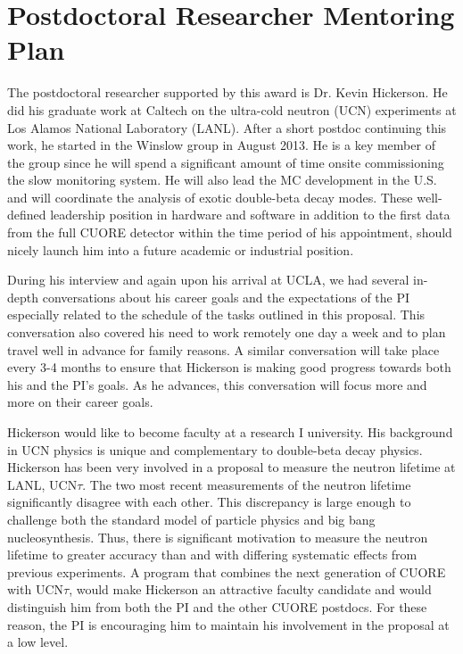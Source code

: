 \section{Postdoctoral Researcher Mentoring Plan}
The postdoctoral researcher supported by this award is Dr. Kevin Hickerson. He did his graduate work at Caltech on the ultra-cold neutron (UCN) experiments at Los Alamos National Laboratory (LANL). After a short postdoc continuing this work, he started in the Winslow group in August 2013. He is a key member of the group since he will spend a significant amount of time onsite commissioning the slow monitoring system. He will also lead the MC development in the U.S. and will coordinate the analysis of exotic double-beta decay modes. These well-defined leadership position in hardware and software in addition to the first data from the full CUORE detector within the time period of his appointment, should nicely launch him into a future academic or industrial position.

During his interview and again upon his arrival at UCLA, we had several in-depth conversations about his career goals and the expectations of the PI especially related to the schedule of the tasks outlined in this proposal.  This conversation also covered his need to work remotely one day a week and to plan travel well in advance for family reasons. A similar conversation will take place every 3-4 months to ensure that Hickerson is making good progress towards both his and the PI's goals. As he advances, this conversation will focus more and more on their career goals.

Hickerson would like to become faculty at a research I university. His background in UCN physics is unique and complementary to double-beta decay physics. Hickerson has been very involved in a proposal to measure the neutron lifetime at LANL, UCN$\tau$.  The two most recent measurements of the neutron lifetime significantly disagree with each other. This discrepancy is large enough to challenge both the standard model of particle physics and big bang nucleosynthesis. Thus, there is significant motivation to measure the neutron lifetime to greater accuracy than and with differing systematic effects from previous experiments. A program that combines the next generation of CUORE with UCN$\tau$, would make Hickerson an attractive faculty candidate and would distinguish him from both the PI and the other CUORE postdocs. For these reason, the PI is encouraging him to maintain his involvement in the proposal at a low level. 

